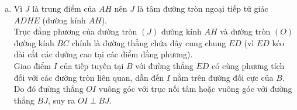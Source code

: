 \begin{bt}
{\begin{enumerate}[a)]
	Vì $O$ là trung điểm của $BC$ nên theo hệ thức Newton cho hàng điểm điều hoà với trung điểm $O$:
	$OB^2 = OC^2 = OF \cdot OK$.\\
	Mặt khác theo hệ thức Maclaurin: $FO \cdot FK = FB \cdot FC$.
	\item Vì $J$ là trung điểm của $AH$ nên $J$ là tâm đường tròn ngoại tiếp tứ giác $ADHE$ (đường kính $AH$).\\
	Trục đẳng phương của đường tròn $(J)$ đường kính $AH$ và đường tròn $(O)$ đường kính $BC$ chính là đường thẳng chứa dây cung chung $ED$ (vì $ED$ kéo dài cắt các đường cao tại các điểm đẳng phương).\\
	Giao điểm $I$ của tiếp tuyến tại $B$ với đường thẳng $ED$ có cùng phương tích đối với các đường tròn liên quan, dẫn đến $I$ nằm trên đường đối cực của $B$.\\
	Do đó đường thẳng $OI$ vuông góc với trục nối tâm hoặc vuông góc với đường thẳng $BJ$, suy ra $OI \perp BJ$.
\end{enumerate}
}
\end{bt}
